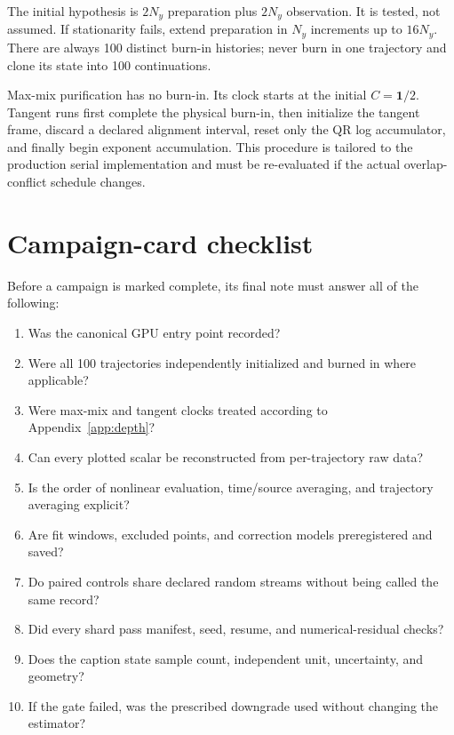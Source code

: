 \documentclass[aps,prx,onecolumn,nofootinbib,superscriptaddress,longbibliography]{revtex4-2}
\newcommand{\Id}{\mathbf{1}}
\begin{document}
The initial hypothesis is $2N_y$ preparation plus $2N_y$ observation.  It is tested, not
assumed.  If stationarity fails, extend preparation in $N_y$ increments up to $16N_y$.
There are always 100 distinct burn-in histories; never burn in one trajectory and clone its
state into 100 continuations.

Max-mix purification has no burn-in.  Its clock starts at the initial $C=\Id/2$.  Tangent
runs first complete the physical burn-in, then initialize the tangent frame, discard a
declared alignment interval, reset only the QR log accumulator, and finally begin exponent
accumulation.  This procedure is tailored to the production serial implementation and must
be re-evaluated if the actual overlap-conflict schedule changes.

\section{Campaign-card checklist}

Before a campaign is marked complete, its final note must answer all of the following:
\begin{enumerate}
\item Was the canonical GPU entry point recorded?
\item Were all 100 trajectories independently initialized and burned in where applicable?
\item Were max-mix and tangent clocks treated according to Appendix~\ref{app:depth}?
\item Can every plotted scalar be reconstructed from per-trajectory raw data?
\item Is the order of nonlinear evaluation, time/source averaging, and trajectory averaging explicit?
\item Are fit windows, excluded points, and correction models preregistered and saved?
\item Do paired controls share declared random streams without being called the same record?
\item Did every shard pass manifest, seed, resume, and numerical-residual checks?
\item Does the caption state sample count, independent unit, uncertainty, and geometry?
\item If the gate failed, was the prescribed downgrade used without changing the estimator?
\end{enumerate}



\end{document}
